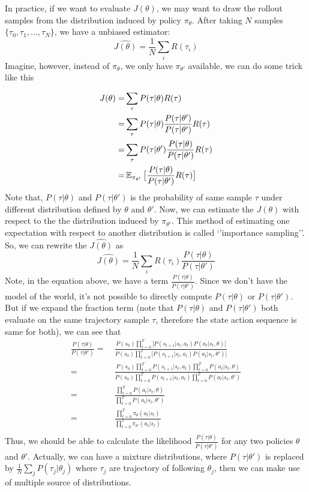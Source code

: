 \documentclass[9pt]{article}
\begin{document}
In practice, if we want to evaluate $J(\theta)$, we may want to draw the rollout samples from the distribution induced by policy $\pi_{\theta}$. After taking $N$ samples $\{\tau_0,\tau_1,\ldots,\tau_N\}$, we have a unbiased estimator:
\[
	\hat{J(\theta)} = \frac{1}{N}\sum_{i}R(\tau_i)
\]
Imagine, however, instead of $\pi_{\theta}$, we only have $\pi_{\theta'}$ available, we can do some trick like this
\begin{comment}
need to figure why can we ignore the dynamic model
\end{comment}
\[
\begin{split}
J(\theta) = & \sum_{\tau}P(\tau|\theta)R(\tau)\\
= & \sum_{\tau}P(\tau|\theta) \frac{P(\tau|\theta')}{P(\tau|\theta')} R(\tau)\\
= & \sum_{\tau}P(\tau|\theta') \frac{P(\tau|\theta)}{P(\tau|\theta')} R(\tau)\\
= & \operatorname{\mathbb{E}}_{\pi_{\theta'}}\big[\frac{P(\tau|\theta)}{P(\tau|\theta')} R(\tau)\big]
\end{split}
\]
Note that, $P(\tau|\theta)$ and $P(\tau|\theta')$ is the probability of same sample $\tau$ under different distribution defined by $\theta$ and $\theta'$. Now, we can estimate the $J(\theta)$ with respect to the the distribution induced by $\pi_{\theta'}$. This method of estimating one expectation with respect to another distribution is called `'importance sampling''. So, we can rewrite the $\hat{J(\theta)}$ as
\[
\hat{J(\theta)} = \frac{1}{N}\sum_{i}R(\tau_i)\frac{P(\tau|\theta)}{P(\tau|\theta')}
\]
Note, in the equation above, we have a term $\frac{P(\tau|\theta)}{P(\tau|\theta')}$. Since we don't have the model of the world, it's not possible to directly compute $P(\tau|\theta)$ or $P(\tau|\theta')$. But if we expand the fraction term (note that $P(\tau|\theta)$ and $P(\tau|\theta')$ both evaluate on the same trajectory sample $\tau$, therefore the state action sequence is same for both), we can see that 
\[
\begin{split}
\frac{P(\tau|\theta)}{P(\tau|\theta')} = &\ \frac{P(s_0)\prod_{t=0}^T\big[P(s_{t+1}|s_t,a_t)P(a_t|s_t, \theta)\big]}{P(s_0)\prod_{t=0}^T\big[P(s_{t+1}|s_t,a_t)P(a_t|s_t,\theta')\big]}\\
= &\ \frac{P(s_0)\prod_{t=0}^TP(s_{t+1}|s_t,a_t)\prod_{t=0}^TP(a_t|s_t, \theta)}{P(s_0)\prod_{t=0}^TP(s_{t+1}|s_t,a_t)\prod_{t=0}^TP(a_t|s_t,\theta')}\\
= &\ \frac{\prod_{t=0}^TP(a_t|s_t,\theta)}{\prod_{t=0}^TP(a_t|s_t,\theta')}\\
= &\ \frac{\prod_{t=0}^T\pi_{\theta}(a_t|s_t)}{\prod_{t=0}^T\pi_{\theta'}(a_t|s_t)}\\
\end{split}
\]
Thus, we should be able to calculate the likelihood $\frac{P(\tau|\theta)}{P(\tau|\theta')}$ for any two policies $\theta$
 and $\theta'$. Actually, we can have a mixture distributions, where $P(\tau|\theta')$ is replaced by $\frac{1}{N}\sum_jP(\tau_j|\theta_j)$ where $\tau_j$ are trajectory of following $\theta_j$, then we can make use of multiple source of distributions.
\end{document}
